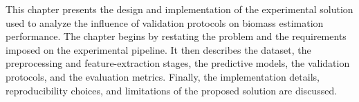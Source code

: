 
        
        		
        
        	
        	


This chapter presents the design and implementation of the experimental solution used to analyze the influence of validation protocols on biomass estimation performance. The chapter begins by restating the problem and the requirements imposed on the experimental pipeline. It then describes the dataset, the preprocessing and feature-extraction stages, the predictive models, the validation protocols, and the evaluation metrics. Finally, the implementation details, reproducibility choices, and limitations of the proposed solution are discussed.

